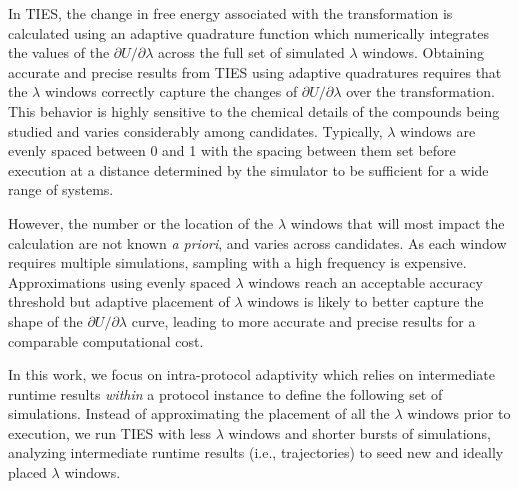 In TIES, the change in free energy associated with the transformation is
calculated using an adaptive quadrature function which numerically integrates
the values of the $\partial U/\partial\lambda$ across the full set of
simulated $\lambda$ windows. Obtaining accurate and precise results from TIES
using adaptive quadratures requires that the $\lambda$ windows correctly
capture the changes of $\partial U/\partial\lambda$ over the transformation.
This behavior is highly sensitive to the chemical details of the compounds
being studied and varies considerably among candidates. Typically, $\lambda$
windows are evenly spaced between 0 and 1 with the spacing between them set
before execution at a distance determined by the simulator to be sufficient
for a wide range of systems.

However, the number or the location of the $\lambda$ windows that will most
impact the calculation are not known \textit{a priori}, and varies across
candidates. As each window requires multiple simulations, sampling with a
high frequency is expensive. Approximations using evenly spaced $\lambda$
windows reach an acceptable accuracy threshold but adaptive placement of
$\lambda$ windows is likely to better capture the shape of the $\partial
U/\partial\lambda$ curve, leading to more accurate and precise results for a
comparable computational cost.

In this work, we focus on intra-protocol adaptivity which relies on
intermediate runtime results \textit{within} a protocol instance to define
the following set of simulations. Instead of approximating the placement of
all the $\lambda$ windows prior to execution, we run TIES with less $\lambda$
windows and shorter bursts of simulations, analyzing intermediate runtime
results (i.e., trajectories) to seed new and ideally placed $\lambda$
windows.